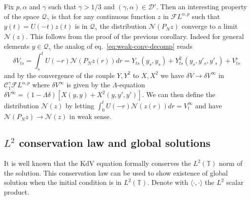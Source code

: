 \documentclass[a4paper,11pt,reqno]{article}
\newcommand{\der}{\delta}
\newcommand{\TT}{\mathbb{T}}
\newcommand{\CC}{\mathcal{C}}
\newcommand{\DD}{\mathcal{D}}
\newcommand{\FF}{\mathcal{F}}
\newcommand{\QQ}{\mathcal{Q}}
\begin{document}
Fix $p,\alpha$ and $\gamma$ such that $\gamma > 1/3$ and $(\gamma,\alpha) \in \DD'$. Then
an interesting property of the space $\QQ_\gamma$ is that for any continuous function $z$  in $\FF L^{\alpha,p}$ such that $y(t) = U(-t)z(t)$ is in 
$\QQ_\gamma$  the distribution $\mathcal{N}(P_N z)$ converge to a limit $\mathcal{N}(z)$. This follows from the proof of the previous corollary. Indeed  for general elements $y\in \QQ_\gamma$ the analog of eq.~\eqref{eq:weak-conv-decomp} reads
$$
\der V_{ts}=
\int_s^t U(-r)\mathcal{N}(P_N z(r)) dr
=Y_{ts}(y_s,y_s)+Y^2_{ts}(y_s,y'_s,y'_s) + V^\flat_{ts}
$$
and by the convergence of the couple $Y,Y^2$ to $X,X^2$ we have
$
\der V \to \der V^\infty
$ in $\CC^\gamma_1 \FF L^{\alpha,p}$ where $\der V^\infty$ is given by the $\Lambda$-equation $\der V^\infty = (1-\Lambda\der)[X(y,y)+X^2(y,y',y')]$. We can then define the distribution $\mathcal{N}(z)$ by letting $  \int_0^t U(-r)\mathcal{N}(z(r)) dr = V^\infty_{t}$ and have $\mathcal{N}(P_N z) \to \mathcal{N}(z)$ in weak sense. 


\subsection{$L^2$ conservation law and global solutions}
\label{sec:global}
It is well known that the KdV equation formally conserves the $L^2(\TT)$ norm of the solution. This conservation law can be used to show
existence of global solution when the initial condition is in $L^2(\TT)$.  
Denote with $\langle \cdot,\cdot \rangle$ the $L^2$ scalar product.
\end{document}
